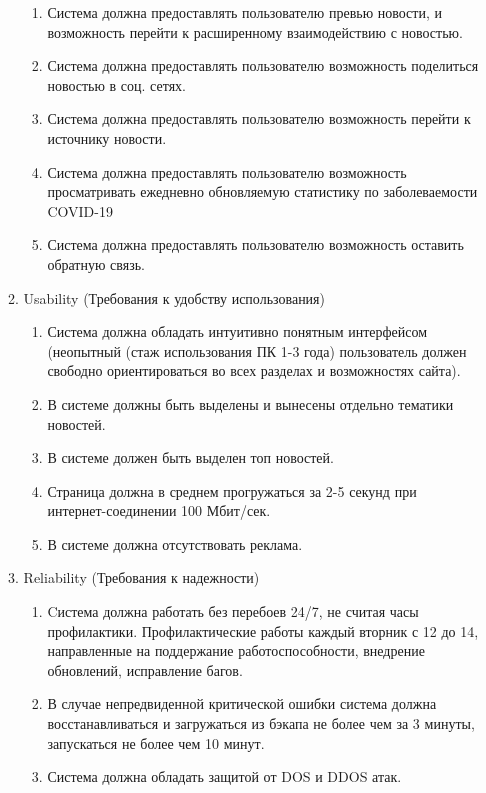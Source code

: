 \begin{enumerate}
\begin{enumerate}[label=3.\arabic*]
\begin{enumerate}[label=3.1.\arabic*]
            \item Система должна предоставлять пользователю превью новости, и возможность перейти к расширенному взаимодействию с новостью.
            \item Система должна предоставлять пользователю возможность поделиться новостью в соц. сетях.
            \item Система должна предоставлять пользователю возможность перейти к источнику новости.
            \item Система должна предоставлять пользователю возможность просматривать ежедневно обновляемую статистику по заболеваемости COVID-19
            \item Система должна предоставлять пользователю возможность оставить обратную связь.
        \end{enumerate}
\BgThispage
        \item Usability (Требования к удобству использования)
        \begin{enumerate}[label=3.2.\arabic*]
            \item Система должна обладать интуитивно понятным интерфейсом (неопытный (стаж использования ПК 1-3 года) пользователь должен свободно ориентироваться во всех разделах и возможностях сайта).
            \item В системе должны быть выделены и вынесены отдельно тематики новостей.
            \item В системе должен быть выделен топ новостей.
            \item Страница должна в среднем прогружаться за 2-5 секунд при интернет-соединении 100 Мбит/сек.
            \item В системе должна отсутствовать реклама.
        \end{enumerate}
        \newpage
        \item Reliability (Требования к надежности)
        \begin{enumerate}[label=3.3.\arabic*]
            \item Cистема должна работать без перебоев 24/7, не считая часы профилактики. Профилактические работы каждый вторник с 12 до 14, направленные на поддержание работоспособности, внедрение обновлений, исправление багов.
            \item В случае непредвиденной критической ошибки система должна восстанавливаться и загружаться из бэкапа не более чем за 3 минуты, запускаться не более чем 10 минут.
            \item Система должна обладать защитой от DOS и DDOS атак.

\end{enumerate}
\end{enumerate}
\end{enumerate}
